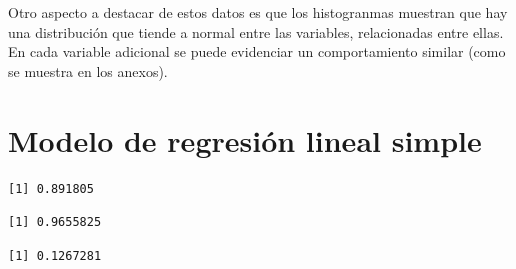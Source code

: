 \documentclass[
]{article}
\newenvironment{Shaded}{\begin{snugshade}}{\end{snugshade}}
\newcommand{\AttributeTok}[1]{\textcolor[rgb]{0.13,0.29,0.53}{#1}}
\newcommand{\CommentTok}[1]{\textcolor[rgb]{0.56,0.35,0.01}{\textit{#1}}}
\newcommand{\FunctionTok}[1]{\textcolor[rgb]{0.13,0.29,0.53}{\textbf{#1}}}
\newcommand{\NormalTok}[1]{#1}
\newcommand{\SpecialCharTok}[1]{\textcolor[rgb]{0.81,0.36,0.00}{\textbf{#1}}}
\newcommand{\StringTok}[1]{\textcolor[rgb]{0.31,0.60,0.02}{#1}}
\begin{document}
Otro aspecto a destacar de estos datos es que los histogranmas muestran
que hay una distribución que tiende a normal entre las variables,
relacionadas entre ellas. En cada variable adicional se puede evidenciar
un comportamiento similar (como se muestra en los anexos).

\section{Modelo de regresión lineal
simple}\label{modelo-de-regresiuxf3n-lineal-simple}

\begin{Shaded}
\end{Shaded}

\begin{verbatim}
[1] 0.891805
\end{verbatim}

\begin{Shaded}
\end{Shaded}

\begin{verbatim}
[1] 0.9655825
\end{verbatim}

\begin{Shaded}
\end{Shaded}

\begin{verbatim}
[1] 0.1267281
\end{verbatim}
\end{document}
